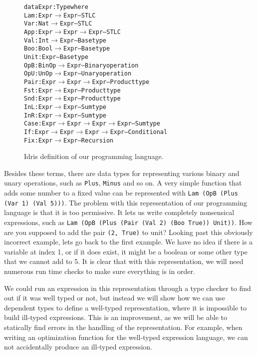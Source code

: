 \begin{center}
\begin{figure}
\begin{alltt}
data Expr : Type where
  Lam  : Expr \(\to\) Expr                 -- STLC
  Var  : Nat \(\to\) Expr                  -- STLC
  App  : Expr \(\to\) Expr \(\to\) Expr         -- STLC
  Val  : Int \(\to\) Expr                  -- Base type
  Boo  : Bool \(\to\) Expr                 -- Base type
  Unit : Expr                         -- Base type
  OpB  : BinOp \(\to\) Expr                -- Binary operation
  OpU  : UnOp \(\to\) Expr                 -- Unary operation
  Pair : Expr \(\to\) Expr \(\to\) Expr         -- Product type
  Fst  : Expr \(\to\) Expr                 -- Product type
  Snd  : Expr \(\to\) Expr                 -- Product type
  InL  : Expr \(\to\) Expr                 -- Sum type
  InR  : Expr \(\to\) Expr                 -- Sum type
  Case : Expr \(\to\) Expr \(\to\) Expr \(\to\) Expr -- Sum type
  If   : Expr \(\to\) Expr \(\to\) Expr \(\to\) Expr -- Conditional
  Fix  : Expr \(\to\) Expr                 -- Recursion
\end{alltt}
\caption{Idris definition of our programming language.}
\label{fig:rstlc}
\end{figure}
\end{center}

Besides these terms, there are data types for representing various binary and unary operations, such as \texttt{Plus}, \texttt{Minus} and so on. A very simple function that adds some number to a fixed value can be represented with \texttt{Lam (OpB (Plus (Var 1) (Val 5)))}. The problem with this representation of our programming language is that it is too permissive. It lets us write completely nonsensical expressions, such as \texttt{Lam (OpB (Plus (Pair (Val 2) (Boo True)) Unit))}. How are you supposed to add the pair \texttt{(2, True)} to unit? Looking past this obviously incorrect example, lets go back to the first example. We have no idea if there is a variable at index 1, or if it does exist, it might be a boolean or some other type that we cannot add to 5. It is clear that with this representation, we will need numerous run time checks to make sure everything is in order. 

We could run an expression in this representation through a type checker to find out if it was well typed or not, but instead we will show how we can use dependent types to define a well-typed representation, where it is impossible to build ill-typed expressions. This is an improvement, as we will be able to statically find errors in the handling of the representation. For example, when writing an optimization function for the well-typed expression language, we can not accidentally produce an ill-typed expression.

